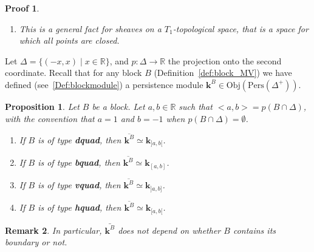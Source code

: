 \documentclass[a4paper, english, 11pt]{article}
\newcommand{\kk}[0]{\textbf{k}}
\newcommand{\Pe}{\text{Pers}}
\newcommand{\0}{\vec{0}}
\newcommand{\R}[0]{\mathbb{R}}
\newcommand{\Obj}[0]{\text{Obj}}
\newcommand{\Hom}[0]{\text{Hom}}
\newtheorem{prop}{Proposition}[section]
\newtheorem*{pf}{Proof} }
\newtheorem{remark}[prop]{Remark}
\begin{document}
\begin{pf}
\begin{enumerate}
     
     Now if $\varprojlim\limits_{]-x;y[\ni \alpha}M((x,y))$ is finite dimensional then the above product in the right hand side of~\eqref{eq:porjlimM} is a finite product and thus a direct sum: 
     $\prod_{\substack{I\in \mathbb{B}(M\circ G)\\ 0 \in \text{closure}(I)}} \kk \; \simeq \; \bigoplus_{\substack{I\in \mathbb{B}(M\circ G)\\ 0 \in \text{closure}(I)}}.$ Therefore we have 
     \begin{align*}
        \varprojlim_{]-x;y[\ni \alpha}M((x,y))%
        & \simeq \bigoplus_{\substack{I\in \mathbb{B}(M\circ G)\\ 0 \in \text{closure}(I)}} \kk  \\
        &\simeq \varprojlim_{]-x;y[\ni \alpha} \Hom \left ( M((x,y)), \kk \right ) \; \text{ (by~\eqref{eq:DefMoG} and finite dimensionality)}\\ 
        &\simeq \tilde{M}_\alpha \; \text{ (by~\eqref{eq:defMtilde})}\\
        &\simeq \bar{M}_\alpha.
    \end{align*}
    \item This is a general fact for sheaves on a $T_1$-topological space, that is a space for which all   points are closed.
\end{enumerate}
\end{pf}

Let $\Delta = \{(-x,x)\mid x\in\R\}$, and $p : \Delta \longrightarrow \R$ the projection onto the second coordinate. Recall that for any block $B$ (Definition~\ref{def:block_MV}) we have defined (see~\ref{Def:blockmodule}) a persistence module $\kk^B\in \Obj(\Pe(\Delta^+))$.
\begin{prop}\label{P:BarofBlock}
Let $B$ be a block. Let $a,b\in \R$ such that $<a,b> = p(B\cap \Delta)$, with the convention that $a=1$ and $b=-1$ when $ p(B\cap \Delta) = \emptyset$.  
\begin{enumerate}
    \item If $B$ is of type \textbf{dquad}, then $\overline{\kk^B} \simeq \kk_{]a,b[}$.
    \item If $B$ is of type \textbf{bquad}, then $\overline{\kk^B} \simeq \kk_{[a,b]}$.
    \item If $B$ is of type \textbf{vquad}, then $\overline{\kk^B} \simeq \kk_{]a,b]}$.
    \item If $B$ is of type \textbf{hquad}, then $\overline{\kk^B} \simeq \kk_{[a,b[}$.
\end{enumerate}
\end{prop}
\begin{remark}
In particular, $\bar{\kk^B}$ does not depend on whether $B$ contains its boundary or not. 
\end{remark}
\end{document}
